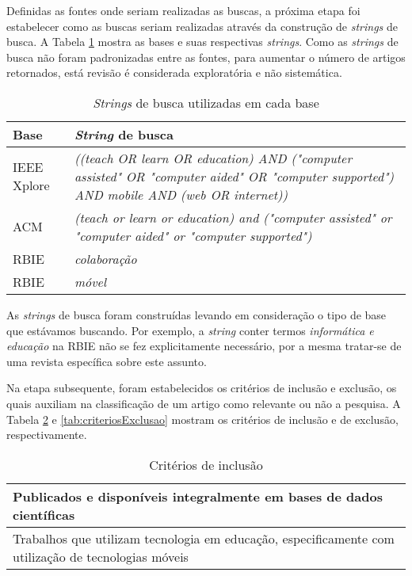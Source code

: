 Definidas as fontes onde seriam realizadas as buscas, a próxima etapa foi estabelecer como as buscas seriam realizadas através da construção de \emph{strings} de busca. A Tabela \ref{tab:strings} mostra as bases e suas respectivas \emph{strings}. Como as \emph{strings} de busca não foram padronizadas entre as fontes, para aumentar o número de artigos retornados, está revisão é considerada exploratória e não sistemática.

\bgroup
\def\arraystretch{1.5} %
\begin{table}[h]{} %
\centering
\begin{tabular}{ | p{3cm} | p{10cm}| } \hline
\textbf{Base} & \textbf{\emph{String} de busca} \\ \hline
IEEE Xplore & \emph{((teach OR learn OR education) AND ("computer assisted" OR "computer aided" OR "computer supported") AND mobile AND (web OR internet))} \\ \hline
ACM & \emph{(teach or learn or education) and ("computer assisted" or "computer aided" or "computer supported")} \\ \hline
RBIE & \emph{colaboração} \\ \hline
RBIE & \emph{móvel} \\ \hline
\end{tabular}
\caption{\emph{Strings} de busca utilizadas em cada base}
\label{tab:strings}
\end{table}
\egroup

As \emph{strings} de busca foram construídas levando em consideração o tipo de base que estávamos buscando. Por exemplo, a \emph{string} conter termos \emph{informática e educação} na RBIE não se fez explicitamente necessário, por a mesma tratar-se de uma revista específica sobre este assunto.

Na etapa subsequente, foram estabelecidos os critérios de inclusão e exclusão, os quais auxiliam na classificação de um artigo como relevante ou não a pesquisa. A Tabela \ref{tab:criteriosInclusao} e \ref{tab:criteriosExclusao} mostram os critérios de inclusão e de exclusão, respectivamente.
\bgroup
\def\arraystretch{1.5} %
\begin{table}[h]{} %
\centering
\begin{tabular}{ | p{14cm}| } \hline
Publicados e disponíveis integralmente em bases de dados científicas \\ \hline
Trabalhos que utilizam tecnologia em educação, especificamente com utilização de tecnologias móveis \\ \hline
\end{tabular}
\caption{Critérios de inclusão}
\label{tab:criteriosInclusao}
\end{table}
\egroup



